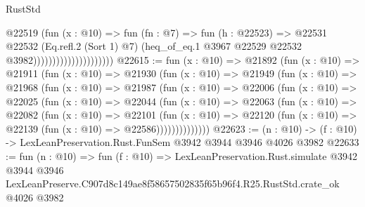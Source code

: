 \begin{lexlean}{RustStd}
\begin{coremodule}
                                        @22519
                                          (fun (x : @10) =>
                                          fun (fn : @7) =>
                                          fun (h : @22523) =>
                                          @22531
                                            @22532
                                            (Eq.refl.{2} (Sort 1) @7)
                                            (heq_of_eq.{1}
                                              @3967
                                              @22529
                                              @22532
                                              @3982)))))))))))))))))))))
@22615 := fun (x : @10) =>
  @21892
    (fun (x : @10) =>
    @21911
      (fun (x : @10) =>
      @21930
        (fun (x : @10) =>
        @21949
          (fun (x : @10) =>
          @21968
            (fun (x : @10) =>
            @21987
              (fun (x : @10) =>
              @22006
                (fun (x : @10) =>
                @22025
                  (fun (x : @10) =>
                  @22044
                    (fun (x : @10) =>
                    @22063
                      (fun (x : @10) =>
                      @22082
                        (fun (x : @10) =>
                        @22101
                          (fun (x : @10) =>
                          @22120 (fun (x : @10) => @22139 (fun (x : @10) => @22586))))))))))))))
@22623 := (n : @10) -> (f : @10) -> LexLeanPreservation.Rust.FunSem @3942 @3944 @3946 @4026 @3982
@22633 := fun (n : @10) =>
  fun (f : @10) =>
  LexLeanPreservation.Rust.simulate
    @3942
    @3944
    @3946
    LexLeanPreserve.C907d8c149ae8f58657502835f65b96f4.R25.RustStd.crate_ok
    @4026
    @3982
\end{coremodule}
\end{lexlean}
